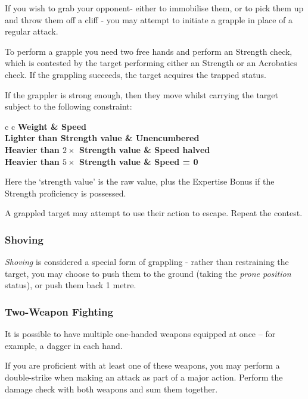 If you wish to grab your opponent- either to immobilise them, or to pick them up and throw them off a cliff - you may attempt to initiate a grapple in place of a regular attack. 

To perform a grapple you need two free hands and perform an Strength check, which is contested by the target performing either an Strength or an Acrobatics check. If the grappling succeeds, the target acquires the trapped status. 

If the grappler is strong enough, then they move whilst carrying the target subject to the following constraint:

\begin{center}
\begin{rndtable}{c c}
\bf Weight	&	\bf Speed
\\
Lighter than Strength value & Unencumbered
\\
Heavier than $2 \times$ Strength value	&	Speed halved
\\
Heavier than $ 5 \times$ Strength value	&	Speed = 0
\end{rndtable}
\end{center}

Here the `strength value' is the raw \attPhys{} value, plus the Expertise Bonus if the Strength proficiency is possessed. 

A grappled target may attempt to use their action to escape. Repeat the contest. 

\subsubsection{Shoving}

{\it Shoving} is considered a special form of grappling - rather than restraining the target, you may choose to push them to the ground (taking the {\it prone position} status), or push them back 1 metre. 

\subsubsection{Two-Weapon Fighting}

It is possible to have multiple one-handed weapons equipped at once -- for example, a dagger in each hand. 

If you are proficient with at least one of these weapons, you may perform a double-strike when making an attack as part of a major action. Perform the damage check with both weapons and sum them together. 

